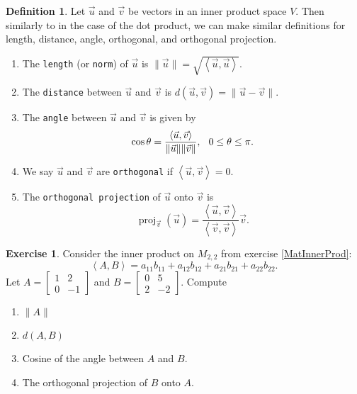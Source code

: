 \documentclass{beamer}
\newcommand{\fn}{\insertframenumber}
\newcommand{\proj}{\operatorname{proj}}
\newcommand{\ip}[2]{\left\langle #1,#2\right\rangle}
\theoremstyle{definition}
\newtheorem{exercise}{Exercise}
\newtheorem*{defn}{Definition}
\renewcommand{\emph}[1]{{\color{blue}\texttt{#1}}}
\begin{document}
\begin{frame}{\fn}
	\begin{defn}
		Let $\vec u$ and $\vec v$ be vectors in an inner product space $V$.  Then similarly to in the case of the dot product, we can make similar definitions for length, distance, angle, orthogonal, and orthogonal projection.
		\begin{enumerate}[label=\textbf{\arabic*.}]
			\item The \emph{length} (or \emph{norm}) of $\vec u$ is $\|\vec u\|=\sqrt{\ip{\vec u}{\vec u}}$.
			\item The \emph{distance} between $\vec u$ and $\vec v$ is $d(\vec u,\vec v)=\|\vec u-\vec v\|$.
			\item The \emph{angle} between $\vec u$ and $\vec v$ is given by
				\[\cos\theta=\frac{\ip{\vec u}{\vec v}}{\|\vec u\|\|\vec v\|},\hspace*{.1in}0\leq\theta\leq \pi.\]
			\item We say $\vec u$ and $\vec v$ are \emph{orthogonal} if $\ip{\vec u}{\vec v}=0$.
			\item The \emph{orthogonal projection} of $\vec u$ onto $\vec v$ is
				\[\proj_{\vec v}(\vec u)=\frac{\ip{\vec u}{\vec v}}{\ip{\vec v}{\vec v}}\vec v.\]
		\end{enumerate}
	\end{defn}
\end{frame}
\begin{frame}{\fn}
	\begin{exercise}
		Consider the inner product on $M_{2,2}$ from exercise \ref{MatInnerProd}:
			\[\ip{A}{B}=a_{11}b_{11}+a_{12}b_{12}+a_{21}b_{21}+a_{22}b_{22}.\]
		Let $A=\begin{bmatrix}1&2\\0&-1\end{bmatrix}$ and $B=\begin{bmatrix}0&5\\2&-2\end{bmatrix}$.
		Compute
		\begin{enumerate}[label=(\alph*)]
			\item $\|A\|$
			\item $d(A,B)$
			\item Cosine of the angle between $A$ and $B$.
			\item The orthogonal projection of $B$ onto $A$.
		\end{enumerate}
	\end{exercise}
\end{frame}
\end{document}
